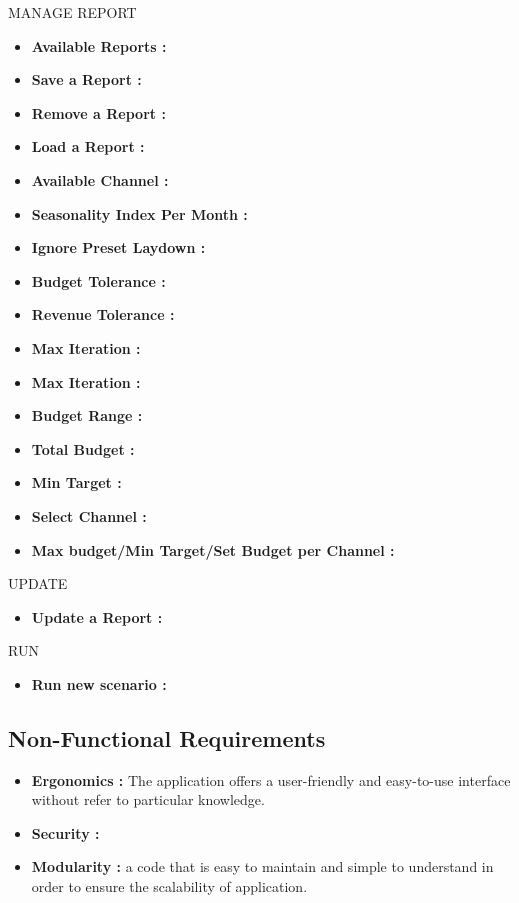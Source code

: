 \documentclass[12pt]{article}
\begin{document}
 	MANAGE REPORT
 		\begin{itemize}
 			\setlength{\itemindent}{+.5in}
 			\item \textbf{Available Reports : } 
 			\item \textbf{Save a Report : }
 			\item \textbf{Remove a Report : }
 			\item \textbf{Load a Report : } 
 			\item \textbf{Available Channel : } 
 			\item \textbf{Seasonality Index Per Month : }
 			\item \textbf{Ignore Preset Laydown : }
 			\item \textbf{Budget Tolerance : }
 			\item \textbf{Revenue Tolerance : }
 			\item \textbf{Max Iteration  : }
 			\item \textbf{Max Iteration  : }
 			\item \textbf{Budget Range : }
 			\item \textbf{Total Budget : }
 			\item \textbf{Min Target : }
 			\item \textbf{Select Channel : }
 			\item \textbf{Max budget/Min Target/Set Budget per Channel : }
 	\end{itemize}
 
  	UPDATE
    \begin{itemize}
    	\setlength{\itemindent}{+.5in}
    	\item \textbf{Update a Report : }
   \end{itemize}

  	RUN
   \begin{itemize}
   	   \setlength{\itemindent}{+.5in}
 	   \item \textbf{Run new scenario : }
   \end{itemize}

    \clearpage
    \newpage

	\subsection{Non-Functional Requirements}
	\begin{itemize}
		\item \textbf{Ergonomics : }The application offers a user-friendly and easy-to-use interface without refer to particular knowledge.
		\item \textbf{Security : }
		\item \textbf{Modularity : }a code that is easy to maintain and simple to understand in order to ensure the scalability of application. 
	\end{itemize}
	\clearpage
	\newpage
	
\end{document}
